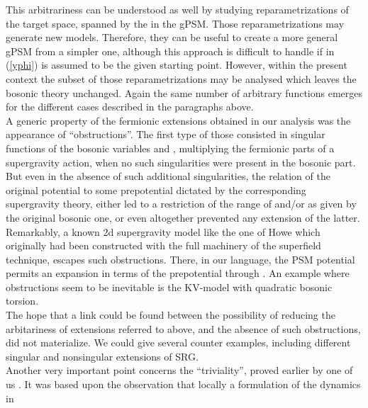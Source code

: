 \documentclass[a4paper,10pt]{article}
\renewcommand{\^}{{}^}
\renewcommand{\_}{\!{}_}
\begin{document}
This arbitrariness can be understood as well 
by studying  
reparametrizations of the target space, spanned by the \coordHE{} 
in the gPSM. Those reparametrizations may generate  new 
models. Therefore, they can be useful to create a more 
general gPSM from a simpler one, although this 
approach is 
difficult to handle if \coordHE{} in (\ref{yphi}) is assumed to be 
the given 
starting point. However, within the present context the 
subset of those reparametrizations may be analysed which 
leaves the bosonic theory unchanged. Again the same number 
of arbitrary functions emerges for the different cases 
described in the paragraphs above. \\
A generic property of the fermionic extensions obtained in 
our analysis was the appearance of ``obstructions''. The 
first type of those consisted in singular functions of the 
bosonic variables \myHighlight{$\phi$}\coordHE{} and \coordHE{}, multiplying the fermionic 
parts of a supergravity action, when no such singularities 
were present in the bosonic part. But even in the absence of 
such additional singularities, the relation of the original 
potential to some prepotential dictated by the 
corresponding supergravity theory, either led to a 
restriction of the range of \myHighlight{$\phi$}\coordHE{} and/or \coordHE{} as given by 
the original bosonic one, or even altogether prevented any 
extension of the latter. Remarkably, a known 2d supergravity 
model like the one of Howe \cite{Howe:1979ia} which 
originally had been  constructed 
with the full machinery of the superfield technique, escapes 
such obstructions. There, in our language, the PSM potential 
\coordHE{} permits an expansion in terms of the prepotential \coordHE{} through \coordHE{}. An example where 
obstructions seem to be inevitable is the KV-model \cite{Katanaev:1986wk} 
with quadratic bosonic torsion. \\
The hope that a link could be found between the possibility 
of reducing the arbitariness of extensions referred to above, and the 
absence of such obstructions, did not materialize. We could 
give several counter examples, including different singular 
and nonsingular extensions of SRG. \\
Another very important point concerns the ``triviality'', 
proved earlier by one of us \cite{Strobl:1999zz}. It was based upon the 
observation that locally a formulation of the dynamics in 
\end{document}
